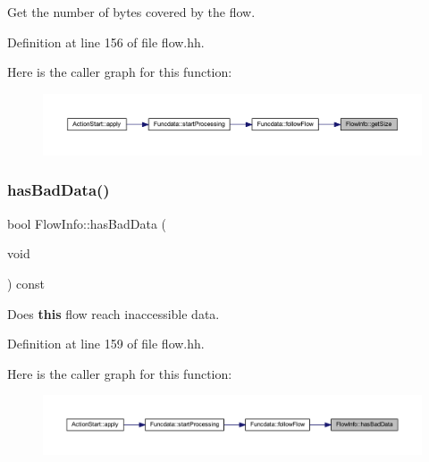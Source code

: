 Get the number of bytes covered by the flow. 



Definition at line 156 of file flow.\+hh.

Here is the caller graph for this function\+:
\nopagebreak
\begin{figure}[H]
\begin{center}
\leavevmode
\includegraphics[width=350pt]{class_flow_info_ac233a410fc8046f112adfc20c5507984_icgraph}
\end{center}
\end{figure}
\mbox{\label{class_flow_info_ad7335051bdbd437701f50bf6dd6bba59}} 
\subsubsection{\texorpdfstring{hasBadData()}{hasBadData()}}
{\footnotesize\ttfamily bool Flow\+Info\+::has\+Bad\+Data (\begin{DoxyParamCaption}\item[{void}]{ }\end{DoxyParamCaption}) const\hspace{0.3cm}{\ttfamily [inline]}}



Does {\bfseries{this}} flow reach inaccessible data. 



Definition at line 159 of file flow.\+hh.

Here is the caller graph for this function\+:
\nopagebreak
\begin{figure}[H]
\begin{center}
\leavevmode
\includegraphics[width=350pt]{class_flow_info_ad7335051bdbd437701f50bf6dd6bba59_icgraph}
\end{center}
\end{figure}
\mbox{\label{class_flow_info_a36a38cdf15f8d2f4eb985c6adfa71e5f}} 
